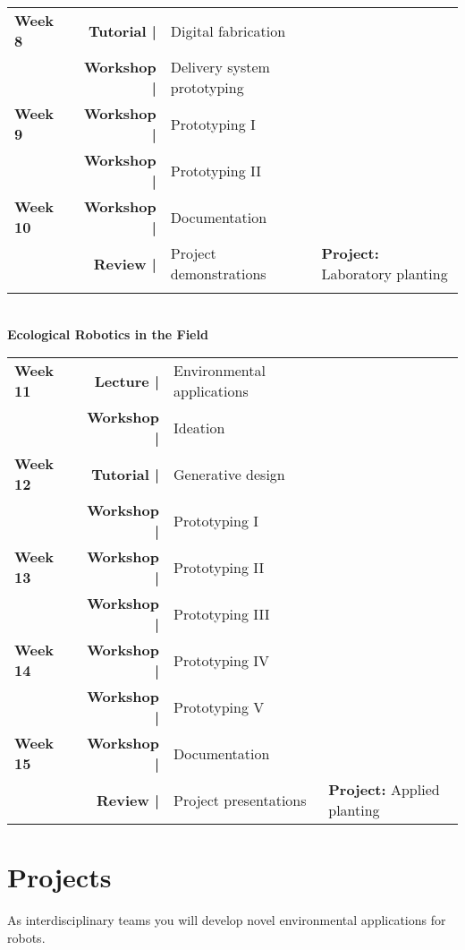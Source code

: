 \documentclass[11pt,article,oneside]{memoir}
\begin{document}
\begin{table}[H]
{\begin{tabular}{l r @{\hskip 0.1cm} l @{\hskip 0.75cm} l}
%
\textbf{Week 8} & \textbf{Tutorial |} & Digital fabrication\\
\textbf{} & \textbf{Workshop |} & Delivery system prototyping\\ 
%
\textbf{Week 9} & \textbf{Workshop |} & Prototyping I\\ 
\textbf{} & \textbf{Workshop |} & Prototyping II\\ 
%
\textbf{Week 10} & \textbf{Workshop |} & Documentation\\ 
\textbf{} & \textbf{Review |} & Project demonstrations & \textbf{Project:} Laboratory planting\\
\\
\end{tabular}}\\
%
\normalsize \textbf{Ecological Robotics in the Field}\\
%
\small{%
\begin{tabular}{l r @{\hskip 0.1cm} l @{\hskip 1cm} l}
\\
\textbf{Week 11} & \textbf{Lecture |} & Environmental applications \\
\textbf{} & \textbf{Workshop |} & Ideation\\
%
\textbf{Week 12} & \textbf{Tutorial |} & Generative design\\
\textbf{} & \textbf{Workshop |} & Prototyping I\\
%
\textbf{Week 13} & \textbf{Workshop |} & Prototyping II\\
\textbf{} & \textbf{Workshop |} & Prototyping III\\
%
\textbf{Week 14} & \textbf{Workshop |} & Prototyping IV\\
\textbf{} & \textbf{Workshop |} & Prototyping V\\
%
\textbf{Week 15} & \textbf{Workshop |} & Documentation\\
\textbf{} & \textbf{Review |} & Project presentations & \textbf{Project:} Applied planting\\ 
%
\end{tabular}}
\end{table}

\clearpage

\section{Projects}
As interdisciplinary teams you will develop 
novel environmental applications for robots.
\\
\end{document}
